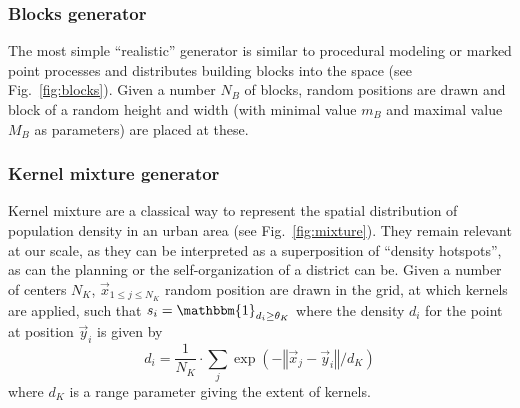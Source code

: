 \documentclass[letterpaper]{article}
\newcommand{\norm}[1]{\left\Vert #1\right\Vert}
\begin{document}
\subsubsection{Blocks generator}

The most simple ``realistic'' generator is similar to procedural modeling or marked point processes and distributes building blocks into the space (see Fig.~\ref{fig:blocks}). Given a number $N_B$ of blocks, random positions are drawn and block of a random height and width (with minimal value $m_B$ and maximal value $M_B$ as parameters) are placed at these.


\subsubsection{Kernel mixture generator}

Kernel mixture are a classical way to represent the spatial distribution of population density in an urban area \citep{anas1998urban} (see Fig.~\ref{fig:mixture}). They remain relevant at our scale, as they can be interpreted as a superposition of ``density hotspots'', as can the planning or the self-organization of a district can be. Given a number of centers $N_K$, $\vec{x}_{1\leq j \leq N_K}$ random position are drawn in the grid, at which kernels are applied, such that $s_i = \mathbbm{1}_{d_i \geq \theta_K}$ where the density $d_i$ for the point at position $\vec{y}_i$ is given by
\begin{equation}
    d_i = \frac{1}{N_K}\cdot \sum_j \exp{\left(-\norm{\vec{x}_j - \vec{y}_i}/d_K\right)} 
\end{equation}
where $d_K$ is a range parameter giving the extent of kernels.
\end{document}
